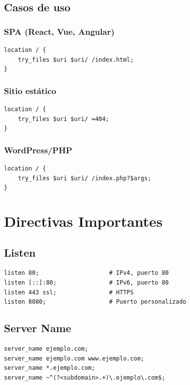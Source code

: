 \documentclass[11pt,a4paper]{article}
\begin{document}
\subsection{Casos de uso}

\subsubsection{SPA (React, Vue, Angular)}
\begin{lstlisting}
location / {
    try_files $uri $uri/ /index.html;
}
\end{lstlisting}

\subsubsection{Sitio estático}
\begin{lstlisting}
location / {
    try_files $uri $uri/ =404;
}
\end{lstlisting}

\subsubsection{WordPress/PHP}
\begin{lstlisting}
location / {
    try_files $uri $uri/ /index.php?$args;
}
\end{lstlisting}

\section{Directivas Importantes}

\subsection{Listen}
\begin{lstlisting}
listen 80;                    # IPv4, puerto 80
listen [::]:80;               # IPv6, puerto 80
listen 443 ssl;               # HTTPS
listen 8080;                  # Puerto personalizado
\end{lstlisting}

\subsection{Server Name}
\begin{lstlisting}
server_name ejemplo.com;
server_name ejemplo.com www.ejemplo.com;
server_name *.ejemplo.com;
server_name ~^(?<subdomain>.+)\.ejemplo\.com$;
\end{lstlisting}
\end{document}
